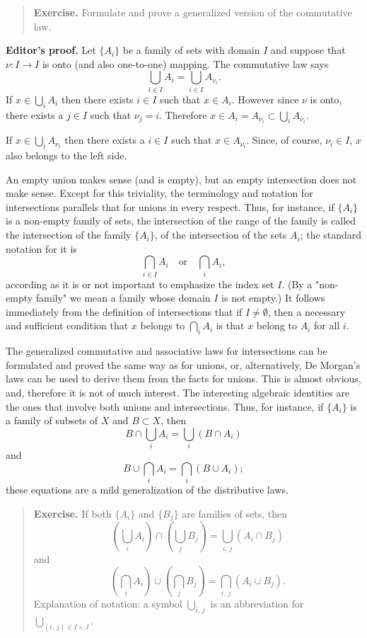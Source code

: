 \begin{quote}
	\textbf{Exercise.} Formulate and prove a generalized version of the commutative law.
\end{quote}

\textbf{Editor's proof.} Let $\{A_i\}$ be a family of sets with domain $I$ and suppose that $\nu : I \to I$ is onto (and also one-to-one) mapping. The commutative law says
\[
	\bigcup_{i \in I} A_i = \bigcup_{i \in I} A_{v_i}.
\]
If $x \in \bigcup_i A_i$ then there exists $i \in I$ such that $x \in A_i$. However since $\nu$ is onto, there exists a $j \in I$ such that $\nu_j = i$. Therefore $x \in A_i = A_{\nu_i} \subset \bigcup_i A_{\nu_i}$.

If $x \in \bigcup_i A_{\nu_i}$ then there exists a $i \in I$ such that $x \in A_{\nu_i}$. Since, of  course, $\nu_i \in I$, $x$ also belongs to the left side.

An empty union makes sense (and is empty), but an empty intersection does not make sense. Except for this triviality, the terminology and notation for intersections parallels that for unions in every respect. Thus, for instance, if $\{A_i\}$ is a non-empty family of sets, the intersection of the range of the family is called the intersection of the family $\{A_i\}$, of the intersection of the sets $A_i$; the standard notation for it is
\[
	\bigcap_{i \in I} A_i \quad \text{or} \quad \bigcap_i A_i,
\]
according as it is or not important to emphasize the index set $I$. (By a "non-empty family" we mean a family whose domain $I$ is not empty.) It follows immediately from the definition of intersections that if $I \neq \emptyset$, then a necessary and sufficient condition that $x$ belongs to $\bigcap_i A_i$ is that $x$ belong to $A_i$ for all $i$.

The generalized commutative and associative laws for intersections can be formulated and proved the same way as for unions, or, alternatively, De Morgan's laws can be used to derive them from the facts for unions. This is almost obvious, and, therefore it is not of much interest. The interesting algebraic identities are the ones that involve both unions and intersections. Thus, for instance, if $\{A_i\}$ is a family of subsets of $X$ and $B \subset X$, then
\[
	B \cap \bigcup_i A_i = \bigcup_i (B \cap A_i)
\]
and
\[
	B \cup \bigcap_i A_i = \bigcap_i (B \cup A_i);
\]
these equations are a mild generalization of the distributive laws.

\begin{quote}
	\textbf{Exercise.} If both $\{A_i\}$ and $\{B_j\}$ are families of sets, then
	\[
		\left( \bigcup_i A_i \right) \cap \left( \bigcup_j B_j \right) = \bigcup_{i, \, j} (A_i \cap B_j)
	\]
	and
	\[
	\left( \bigcap_i A_i \right) \cup \left( \bigcap_j B_j \right) = \bigcap_{i, \, j} (A_i \cup B_j).
	\]
	Explanation of notation: a symbol $\bigcup_{i, \, j}$ is an abbreviation for $\bigcup_{(i, \, j) \in I \times J}$.
\end{quote}

